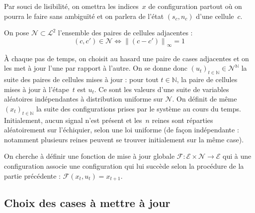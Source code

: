 \documentclass[11pt, openany, a4paper]{article}
\newcommand{\N}{\mathbb{N}}
\newcommand{\norm}[1]{\left\lVert#1\right\rVert}
\newcommand{\La}{\mathcal{L}}
\newcommand{\Ne}{\mathcal{N}}
\newcommand{\E}{\mathcal{E}}
\begin{document}
Par souci de lisibilité, on omettra les indices~$x$ de configuration partout où on pourra le faire sans ambiguïté et on parlera de l'état $(s_c, n_c)$ d'une cellule~$c$.

On pose $\Ne \subset \La^2$ l'ensemble des paires de cellules adjacentes : $$(c, c') \in \Ne \iff \norm{(c-c')}_\infty = 1$$

À chaque pas de temps, on choisit au hasard une paire de cases adjacentes et on les met à jour l'une par rapport à l'autre.
On se donne donc $(u_t)_{t\in\N} \in \Ne^\N$ la suite des paires de cellules mises à jour : pour tout $t\in\N$, la paire de cellules mises à jour à l'étape~$t$ est $u_t$. Ce sont les valeurs d'une suite de variables aléatoires indépendantes à distribution uniforme sur $\Ne$. On définit de même $(x_t)_{t\in\N}$ la suite des configurations prises par le système au cours du temps. Initialement, aucun signal n'est présent et les~$n$ reines sont réparties aléatoirement sur l'échiquier, selon une loi uniforme (de façon indépendante : notamment plusieurs reines peuvent se trouver initialement sur la même case). 

On cherche à définir une fonction de mise à jour globale $\mathcal{F} : {\E\times\Ne}\to\E$ qui à une configuration associe une configuration qui lui succède selon la procédure de la partie précédente : \mbox{$\mathcal{F}(x_t, u_t) = x_{t+1}$}.

 
\subsection{Choix des cases à mettre à jour}
\end{document}
